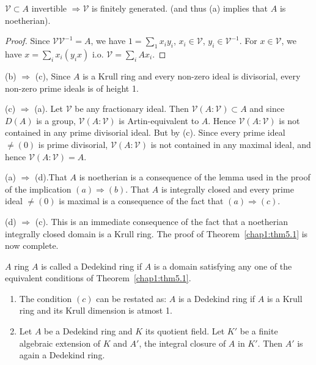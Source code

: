 \begin{lemma*} 
$\mathscr{V} \subset A $ invertible $\Rightarrow \mathscr{V}$ is
    finitely generated. (and thus (a) implies that $A$ is noetherian). 
\end{lemma*}  
  
\begin{proof} %
Since $\mathscr{V} \mathscr{V}^{-1} = A$, we have $1 = \sum\limits_1
x_i y_i$, $x_i \in \mathscr{V}$, $y_i \in \mathscr{V}^{-1}$. 
 For $x \in \mathscr{V}$, we have $x = \sum\limits_i x_i (y_i x)$ i.o.
$\mathscr{V} = \sum\limits_i Ax_i$. 
\end{proof}  
   
  \noindent
  (b) $\Rightarrow$ (c), Since $A$ is a Krull ring and every non-zero
  ideal is divisorial, every non-zero prime ideals is of height 1. 
  
\noindent
(c) $\Rightarrow$ (a). Let $\mathscr{V}$ be any fractionary
ideal. Then $\mathscr{V}(A: \mathscr{V}) \subset A$ and since
$D(A)$ is a group, $\mathscr{V} (A : \mathscr{V})$ is Artin-equivalent
to $A$. Hence $\mathscr{V}(A: \mathscr{V})$ is not contained in
any prime divisorial ideal. But by (c). Since every prime ideal
$\neq (0)$ is prime divisorial, $\mathscr{V} (A: \mathscr{V})$ is not
contained in any maximal ideal, and hence $\mathscr{V} (A :
\mathscr{V}) = A$. 
  
\noindent
  (a) $\Rightarrow$ (d).\pageoriginale That $A$ is noetherian is a
consequence of the lemma used in the proof of the implication $(a)
\Rightarrow (b)$. That $A$ is integrally closed and every prime ideal
$\neq (0)$ is maximal is a consequence  of the fact that $(a)
\Rightarrow (c)$.  
   
  \noindent
  (d) $\Rightarrow$ (c). This is an immediate consequence of the
  fact that a noetherian integrally closed domain is a Krull ring. The
  proof of Theorem~\ref{chap1:thm5.1} is now complete. 
  
\setcounter{definition}{1}
  \begin{definition} %
$A$ ring $A$ is called a Dedekind ring if $A$ is a domain satisfying
    any one of the equivalent conditions of Theorem~\ref{chap1:thm5.1}. 
  \end{definition}
  
\begin{remark*} %
\begin{enumerate} [(1)]
\item The condition $(c)$ can be restated as: $A$ is a Dedekind ring
  if $A$ is a Krull ring and its Krull dimension is atmost 1. 

\item Let $A$ be a Dedekind ring and $K$ its quotient field. Let $K'$
  be a finite algebraic extension of $K$ and $A'$, the integral
  closure of $A$ in $K'$. Then $A'$ is again a Dedekind ring. 
\end{enumerate}  
\end{remark*}  
  
